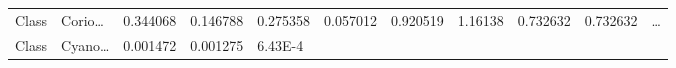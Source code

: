 \documentclass[
]{article}
\begin{document}
\begin{longtable}[]{@{}lllllllllll@{}}
\begin{minipage}[t]{0.06\columnwidth}
Class\strut
\end{minipage} & \begin{minipage}[t]{0.06\columnwidth}\raggedright
Corio\ldots{}\strut
\end{minipage} & \begin{minipage}[t]{0.09\columnwidth}\raggedright
0.344068\strut
\end{minipage} & \begin{minipage}[t]{0.06\columnwidth}\raggedright
0.146788\strut
\end{minipage} & \begin{minipage}[t]{0.09\columnwidth}\raggedright
0.275358\strut
\end{minipage} & \begin{minipage}[t]{0.06\columnwidth}\raggedright
0.057012\strut
\end{minipage} & \begin{minipage}[t]{0.09\columnwidth}\raggedright
0.920519\strut
\end{minipage} & \begin{minipage}[t]{0.06\columnwidth}\raggedright
1.16138\strut
\end{minipage} & \begin{minipage}[t]{0.06\columnwidth}\raggedright
0.732632\strut
\end{minipage} & \begin{minipage}[t]{0.06\columnwidth}\raggedright
0.732632\strut
\end{minipage} & \begin{minipage}[t]{0.03\columnwidth}\raggedright
\ldots{}\strut
\end{minipage}\tabularnewline
\begin{minipage}[t]{0.06\columnwidth}\raggedright
Class\strut
\end{minipage} & \begin{minipage}[t]{0.06\columnwidth}\raggedright
Cyano\ldots{}\strut
\end{minipage} & \begin{minipage}[t]{0.09\columnwidth}\raggedright
0.001472\strut
\end{minipage} & \begin{minipage}[t]{0.06\columnwidth}\raggedright
0.001275\strut
\end{minipage} & \begin{minipage}[t]{0.09\columnwidth}\raggedright
6.43E-4\strut
\end{minipage} & \begin{minipage}[t]{0.06\columnwidth}\raggedright

\end{minipage}
\end{longtable}
\end{document}

